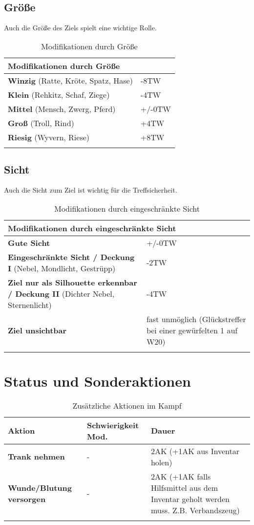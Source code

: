 \subsection{Größe}
Auch die Größe des Ziels spielt eine wichtige Rolle.

\begin{longtable}{|p{5cm}|p{6cm}|}
\hline
\multicolumn{2}{|l|}{\textbf{Modifikationen durch Grö{\ss}e}} \\ \hline
\textbf{Winzig} (Ratte, Kröte, Spatz, Hase) & -8TW \\ \hline
\textbf{Klein} (Rehkitz, Schaf, Ziege) & -4TW \\ \hline
\textbf{Mittel} (Mensch, Zwerg, Pferd) & +/-0TW \\ \hline
\textbf{Groß} (Troll, Rind) & +4TW \\ \hline
\textbf{Riesig} (Wyvern, Riese) & +8TW \\ \hline

\caption{Modifikationen durch Grö{\ss}e}
\label{tab:GrösseModifikationen}
\end{longtable}

\subsection{Sicht}
Auch die Sicht zum Ziel ist wichtig für die Treffsicherheit. 

\begin{longtable}{|p{5cm}|p{6cm}|}
\hline
\multicolumn{2}{|l|}{\textbf{Modifikationen durch eingeschränkte Sicht}} \\ \hline
\textbf{Gute Sicht} & +/-0TW \\ \hline
\textbf{Eingeschränkte Sicht / Deckung I} (Nebel, Mondlicht, Gestrüpp) & -2TW \\ \hline
\textbf{Ziel nur als Silhouette erkennbar / Deckung II} (Dichter Nebel, Sternenlicht) & -4TW \\ \hline
\textbf{Ziel unsichtbar} & fast unmöglich (Glückstreffer bei einer gewürfelten 1 auf W20) \\ \hline

\caption{Modifikationen durch eingeschränkte Sicht}
\label{tab:SichtModifikationen}
\end{longtable}


\section{Status und Sonderaktionen}
\begin{longtable}{|p{4cm}|p{5cm}|p{6.5cm}|}
\hline
\textbf{Aktion} & \textbf{Schwierigkeit Mod.} & \textbf{Dauer} \\

\hline
\textbf{Trank nehmen} & - & 2AK (+1AK aus Inventar holen) \\

\hline
\textbf{Wunde/Blutung versorgen} & - & 2AK (+1AK falls Hilfsmittel aus dem Inventar geholt werden muss. Z.B. Verbandszeug) \\

\hline
\caption{Zusätzliche Aktionen im Kampf}
\label{tab:ZusätzlicheAktionen}
\end{longtable}


